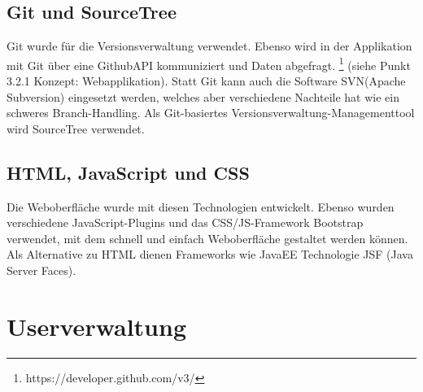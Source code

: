 \subsection{Git und SourceTree}
Git wurde für die Versionsverwaltung verwendet. Ebenso wird in der Applikation mit Git über eine GithubAPI kommuniziert und Daten abgefragt. \footnote{https://developer.github.com/v3/} (siehe Punkt 3.2.1 Konzept: Webapplikation). Statt Git kann auch die Software SVN(Apache Subversion) eingesetzt werden, welches aber verschiedene Nachteile hat wie ein schweres Branch-Handling. Als Git-basiertes Versionsverwaltung-Managementtool wird SourceTree verwendet.
\subsection{HTML, JavaScript und CSS}
Die Weboberfläche wurde mit diesen Technologien entwickelt. Ebenso wurden verschiedene JavaScript-Plugins und das CSS/JS-Framework Bootstrap verwendet, mit dem schnell und einfach Weboberfläche gestaltet werden können. Als Alternative zu HTML dienen Frameworks wie JavaEE Technologie JSF (Java Server Faces).
\section{Userverwaltung}
